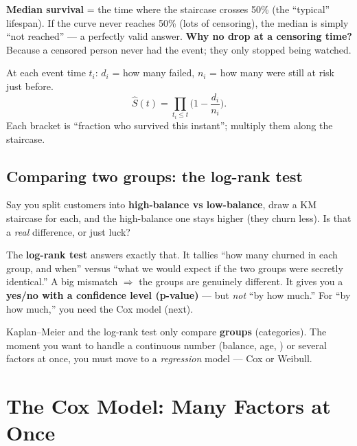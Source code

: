 \documentclass[11pt]{article}
\newcommand{\code}[1]{\texttt{\detokenize{#1}}}
\begin{document}
\begin{plainbox}
\textbf{Median survival} = the time where the staircase crosses 50\% (the ``typical'' lifespan). If
the curve never reaches 50\% (lots of censoring), the median is simply ``not reached'' --- a
perfectly valid answer. \textbf{Why no drop at a censoring time?} Because a censored person never had
the event; they only stopped being watched.
\end{plainbox}

\begin{mathbox}
At each event time $t_i$: $d_i$ = how many failed, $n_i$ = how many were still at risk just before.
$$\hat S(t)=\prod_{t_i\le t}\Big(1-\frac{d_i}{n_i}\Big).$$
Each bracket is ``fraction who survived this instant''; multiply them along the staircase.
\end{mathbox}

\subsection{Comparing two groups: the log-rank test}
Say you split customers into \textbf{high-balance vs low-balance}, draw a KM staircase for each, and
the high-balance one stays higher (they churn less). Is that a \emph{real} difference, or just luck?

\begin{plainbox}
The \textbf{log-rank test} answers exactly that. It tallies ``how many churned in each group, and
when'' versus ``what we would expect if the two groups were secretly identical.'' A big mismatch
$\Rightarrow$ the groups are genuinely different. It gives you a \textbf{yes/no with a confidence
level (p-value)} --- but \emph{not} ``by how much.'' For ``by how much,'' you need the Cox model
(next).
\end{plainbox}

\begin{pitbox}
Kaplan--Meier and the log-rank test only compare \textbf{groups} (categories). The moment you want
to handle a continuous number (balance, age, \code{gap_z}) or several factors at once, you must move
to a \emph{regression} model --- Cox or Weibull.
\end{pitbox}

\section{The Cox Model: Many Factors at Once}
\end{document}
